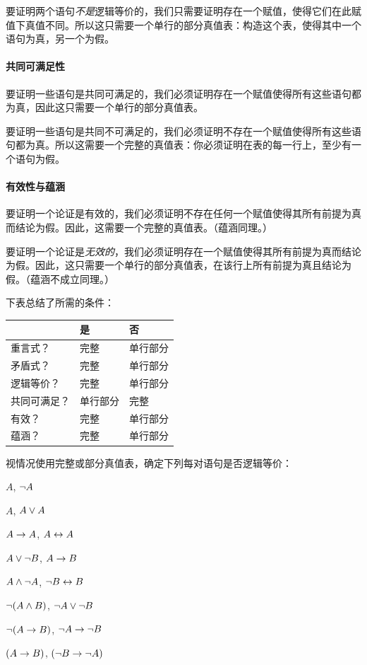 要证明两个语句\emph{不是}逻辑等价的，我们只需要证明存在一个赋值，使得它们在此赋值下真值不同。所以这只需要一个单行的部分真值表：构造这个表，使得其中一个语句为真，另一个为假。

\paragraph{共同可满足性}
要证明一些语句是共同可满足的，我们必须证明存在一个赋值使得所有这些语句都为真，因此这只需要一个单行的部分真值表。

要证明一些语句是共同不可满足的，我们必须证明不存在一个赋值使得所有这些语句都为真。所以这需要一个完整的真值表：你必须证明在表的每一行上，至少有一个语句为假。

\paragraph{有效性与蕴涵}
要证明一个论证是有效的，我们必须证明不存在任何一个赋值使得其所有前提为真而结论为假。因此，这需要一个完整的真值表。（蕴涵同理。）

要证明一个论证是\emph{无效的}，我们必须证明存在一个赋值使得其所有前提为真而结论为假。因此，这只需要一个单行的部分真值表，在该行上所有前提为真且结论为假。（蕴涵不成立同理。）

下表总结了所需的条件：

\begin{center}
\begin{tabular}{l l l}
 & \textbf{是} & \textbf{否}\\
 \hline
重言式？ & 完整 & 单行部分 \\
矛盾式？ & 完整 & 单行部分 \\
逻辑等价？ & 完整  & 单行部分 \\
共同可满足？ & 单行部分 & 完整 \\
有效？ & 完整 & 单行部分 \\
蕴涵？ & 完整 & 单行部分\\
\end{tabular}
\end{center}


\label{table.CompleteVsPartial}

\practiceproblems

\problempart
\label{pr.TT.equiv3}
视情况使用完整或部分真值表，确定下列每对语句是否逻辑等价：


\begin{compactlist}
\item $A$, $\neg A$ %
\item $A$, $A \vee A$ %
\item $A\rightarrow A$, $A \leftrightarrow A$ %
\item $A \vee \neg B$, $A\rightarrow B$ %
\item $A \wedge \neg A$, $\neg B \leftrightarrow B$ %
\item $\neg(A \wedge B)$, $\neg A \vee \neg B$ %
\item $\neg(A \rightarrow B)$, $\neg A \rightarrow \neg B$ %
\item $(A \rightarrow B)$, $(\neg B \rightarrow \neg A)$ %
\end{compactlist}

